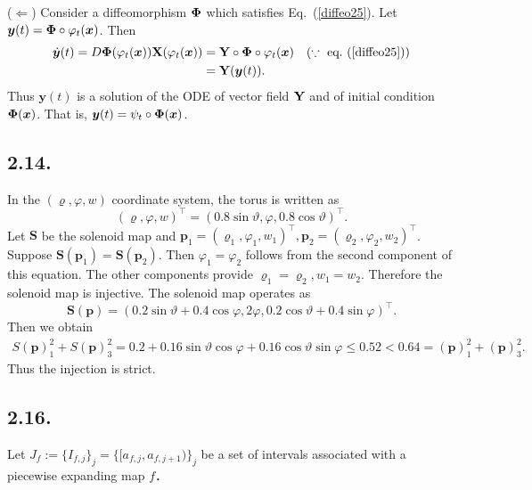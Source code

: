 \documentclass[a4paper,11pt,fleqn]{article}
\begin{document}
($\Leftarrow$) Consider a diffeomorphism ${\bf \Phi}$ which satisfies Eq.~(\ref{diffeo25}). Let ${\bm y}(t) = {\bf \Phi}\circ {\varphi}_t ({\bm x})$. Then 
\begin{align}
    \dot{\bm y}(t) = D{\bf \Phi}({\varphi}_t({\bm x})){\bf X}({\varphi}_t({\bm x})) &= {\bf Y}\circ {\bf \Phi} \circ {\varphi}_t ({\bm x}) \quad (\because \ \text{eq.~}(\ref{diffeo25})) \nonumber \\
    &= {\bf Y}({\bm y}(t)). 
\end{align}
Thus ${\bm y}(t)$ is a solution of the ODE of vector field ${\bf Y}$ and of initial condition ${\bf \Phi}({\bm x})$. That is, ${\bm y} (t)= {\psi}_t \circ {\bf \Phi}({\bm x})$. 

\hruleskip

\subsection{2.14.}
In the $(\varrho,\varphi,w)$ coordinate system, the torus is written as 
\begin{equation}
    (\varrho,\varphi,w)^\top = (0.8\sin{\vartheta},\varphi,0.8\cos{\vartheta})^\top.
\end{equation}
Let ${\bm S}$ be the solenoid map and ${\bm p}_1 = (\varrho_1,\varphi_1,w_1)^\top, {\bm p}_2 = (\varrho_2,\varphi_2,w_2)^\top$. Suppose ${\bm S}({\bm p}_1) = {\bm S}({\bm p}_2) $. Then $\varphi_1=\varphi_2$ follows from the second component of this equation. The other components provide $\varrho_1=\varrho_2, w_1 = w_2$. Therefore the solenoid map is injective. The solenoid map operates as
\begin{equation}
    {\bm S}({\bm p})= (0.2\sin{\vartheta}+0.4\cos{\varphi},2\varphi,0.2\cos{\vartheta}+0.4\sin{\varphi})^\top. 
\end{equation}
Then we obtain 
\begin{align}
    S({\bm p})_1^2+S({\bm p})_3^2 = 0.2+0.16\sin{\vartheta}\cos{\varphi}+0.16\cos{\vartheta}\sin{\varphi} \le 0.52 < 0.64 = ({\bm p})_1^2+({\bm p})_3^2. 
\end{align}
Thus the injection is strict. 

\hruleskip

\subsection{2.16.}
Let $J_f := \{I_{f,j}\}_j = \{[a_{f,j},a_{f,j+1})\}_j$ be a set of intervals associated with a piecewise expanding map $f$．
\end{document}
